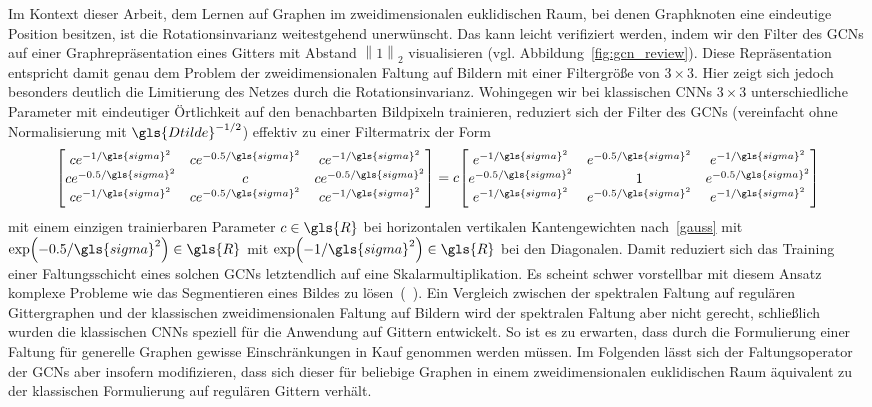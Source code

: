 Im Kontext dieser Arbeit, dem Lernen auf Graphen im zweidimensionalen euklidischen Raum, bei denen Graphknoten eine eindeutige Position besitzen, ist die Rotationsinvarianz weitestgehend unerwünscht.
Das kann leicht verifiziert werden, indem wir den Filter des \glspl{GCN} auf einer Graphrepräsentation eines Gitters mit Abstand $\left\|1\right\|_2$ visualisieren (vgl. Abbildung~\ref{fig:gcn_review}).
Diese Repräsentation entspricht damit genau dem Problem der zweidimensionalen Faltung auf Bildern mit einer Filtergröße von $3 \times 3$.
Hier zeigt sich jedoch besonders deutlich die Limitierung des Netzes durch die Rotationsinvarianz.
Wohingegen wir bei klassischen \glspl{CNN} $3 \times 3$ unterschiedliche Parameter mit eindeutiger Örtlichkeit auf den benachbarten Bildpixeln trainieren, reduziert sich der Filter des \glspl{GCN} (vereinfacht ohne Normalisierung mit $\gls{Dtilde}^{-1/2}$) effektiv zu einer Filtermatrix der Form
\begin{equation*}
  \begin{bmatrix}
    ce^{-1/\gls{sigma}^2} & ce^{-0.5/\gls{sigma}^2} & ce^{-1/\gls{sigma}^2}\\
    ce^{-0.5/\gls{sigma}^2} & c & ce^{-0.5/\gls{sigma}^2}\\
    ce^{-1/\gls{sigma}^2} & ce^{-0.5/\gls{sigma}^2} & ce^{-1/\gls{sigma}^2}
  \end{bmatrix} = c \begin{bmatrix}
    e^{-1/\gls{sigma}^2} & e^{-0.5/\gls{sigma}^2} & e^{-1/\gls{sigma}^2}\\
    e^{-0.5/\gls{sigma}^2} & 1 & e^{-0.5/\gls{sigma}^2}\\
    e^{-1/\gls{sigma}^2} & e^{-0.5/\gls{sigma}^2} & e^{-1/\gls{sigma}^2}
  \end{bmatrix}
\end{equation*}
mit einem einzigen trainierbaren Parameter $c \in \gls{R}$ bei horizontalen \bzw{} vertikalen Kantengewichten nach~\eqref{gauss} mit $\exp\left(-0.5/\gls{sigma}^2\right) \in \gls{R}$ \bzw{} mit $\exp\left(-1/\gls{sigma}^2\right) \in \gls{R}$ bei den Diagonalen.
Damit reduziert sich das Training einer Faltungsschicht eines solchen \glspl{GCN} letztendlich auf eine Skalarmultiplikation.
Es scheint schwer vorstellbar mit diesem Ansatz komplexe Probleme wie \zB{} das Segmentieren eines Bildes zu lösen~(\vgl{}~\cite{gcn_review}).
Ein Vergleich zwischen der spektralen Faltung auf regulären Gittergraphen und der klassischen zweidimensionalen Faltung auf Bildern wird der spektralen Faltung aber nicht gerecht, schließlich wurden die klassischen \glspl{CNN} speziell für die Anwendung auf Gittern entwickelt.
So ist es zu erwarten, dass durch die Formulierung einer Faltung für generelle Graphen gewisse Einschränkungen in Kauf genommen werden müssen.
Im Folgenden lässt sich der Faltungsoperator der \glspl{GCN} aber insofern modifizieren, dass sich dieser für beliebige Graphen in einem zweidimensionalen euklidischen Raum äquivalent zu der klassischen Formulierung auf regulären Gittern verhält.

